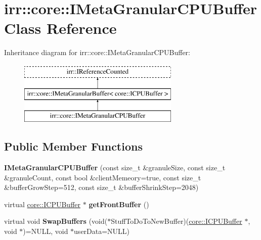 \hypertarget{classirr_1_1core_1_1IMetaGranularCPUBuffer}{}\section{irr\+:\+:core\+:\+:I\+Meta\+Granular\+C\+P\+U\+Buffer Class Reference}
\label{classirr_1_1core_1_1IMetaGranularCPUBuffer}
Inheritance diagram for irr\+:\+:core\+:\+:I\+Meta\+Granular\+C\+P\+U\+Buffer\+:\begin{figure}[H]
\begin{center}
\leavevmode
\includegraphics[height=3.000000cm]{classirr_1_1core_1_1IMetaGranularCPUBuffer}
\end{center}
\end{figure}
\subsection*{Public Member Functions}
\begin{DoxyCompactItemize}
\item 
{\bfseries I\+Meta\+Granular\+C\+P\+U\+Buffer} (const size\+\_\+t \&granule\+Size, const size\+\_\+t \&granule\+Count, const bool \&client\+Memeory=true, const size\+\_\+t \&buffer\+Grow\+Step=512, const size\+\_\+t \&buffer\+Shrink\+Step=2048)\hypertarget{classirr_1_1core_1_1IMetaGranularCPUBuffer_a79aeb46c01f8ad65f03a020ec53d0abd}{}\label{classirr_1_1core_1_1IMetaGranularCPUBuffer_a79aeb46c01f8ad65f03a020ec53d0abd}

\item 
virtual \hyperlink{classirr_1_1core_1_1ICPUBuffer}{core\+::\+I\+C\+P\+U\+Buffer} $\ast$ {\bfseries get\+Front\+Buffer} ()\hypertarget{classirr_1_1core_1_1IMetaGranularCPUBuffer_ac3d08aca62d511d17f0c7fbb11773ab1}{}\label{classirr_1_1core_1_1IMetaGranularCPUBuffer_ac3d08aca62d511d17f0c7fbb11773ab1}

\item 
virtual void {\bfseries Swap\+Buffers} (void($\ast$Stuff\+To\+Do\+To\+New\+Buffer)(\hyperlink{classirr_1_1core_1_1ICPUBuffer}{core\+::\+I\+C\+P\+U\+Buffer} $\ast$, void $\ast$)=N\+U\+LL, void $\ast$user\+Data=N\+U\+LL)\hypertarget{classirr_1_1core_1_1IMetaGranularCPUBuffer_a2697927ad936d009c06b8e649f33dcf8}{}\label{classirr_1_1core_1_1IMetaGranularCPUBuffer_a2697927ad936d009c06b8e649f33dcf8}

\end{DoxyCompactItemize}
